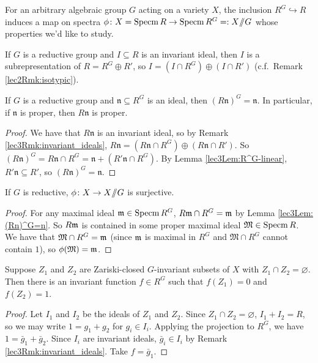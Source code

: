 
For an arbitrary algebraic group $G$ acting on a variety $X$, the inclusion $R^G\hookrightarrow R$ induces a map on spectra $\phi\colon X=\operatorname{Specm} R\to \operatorname{Specm} R^G=:X\mbox{\rm /\!\!/} G$ whose properties we'd like to study.
\begin{remark}\label{lec3Rmk:invariant_ideals}
 If $G$ is a reductive group and $I\subseteq R$ is an invariant ideal, then $I$ is a subrepresentation of $R=R^G\oplus R'$, so $I=(I\cap R^G)\oplus (I\cap R')$ (c.f.~Remark \ref{lec2Rmk:isotypic}).
\end{remark}
\begin{lemma}\label{lec3Lem:(Rn)^G=n}
 If $G$ is a reductive group and $\mathfrak n\subseteq R^G$ is an ideal, then $(R \mathfrak n)^G=\mathfrak n$. In particular, if $\mathfrak n$ is proper, then $R \mathfrak n$ is proper.
\end{lemma}
\begin{proof}
 We have that $R \mathfrak n$ is an invariant ideal, so by Remark \ref{lec3Rmk:invariant_ideals}, $R\mathfrak n=(R\mathfrak n\cap R^G)\oplus (R\mathfrak n\cap R')$. So $(R\mathfrak n)^G= R\mathfrak n\cap R^G = \mathfrak n + (R'\mathfrak n\cap R^G)$. By Lemma \ref{lec3Lem:R^G-linear}, $R'\mathfrak n\subseteq R'$, so $(R\mathfrak n)^G=\mathfrak n$.
\end{proof}
\begin{corollary}\label{lec3Cor:phi_surjective}
 If $G$ is reductive, $\phi\colon X\to X\mbox{\rm /\!\!/} G$ is surjective.
\end{corollary}
\begin{proof}
 For any maximal ideal $\mathfrak{m}\in \operatorname{Specm} R^G$, $R\mathfrak{m}\cap R^G=\mathfrak{m}$ by Lemma \ref{lec3Lem:(Rn)^G=n}. So $R\mathfrak{m}$ is contained in some proper maximal ideal $\mathfrak M\in \operatorname{Specm} R$. We have that $\mathfrak M \cap R^G=\mathfrak{m}$ (since $\mathfrak{m}$ is maximal in $R^G$ and $\mathfrak M\cap R^G$ cannot contain $1$), so $\phi(\mathfrak M)=\mathfrak{m}$.
\end{proof}
\begin{lemma}\label{lec3Lem:separation}
 Suppose $Z_1$ and $Z_2$ are Zariski-closed $G$-invariant subsets of $X$ with $Z_1\cap Z_2=\varnothing$. Then there is an invariant function $f\in R^G$ such that $f(Z_1)=0$ and $f(Z_2)=1$.
\end{lemma}
\begin{proof}
 Let $I_1$ and $I_2$ be the ideals of $Z_1$ and $Z_2$. Since $Z_1\cap Z_2=\varnothing$, $I_1+I_2=R$, so we may write $1=g_1+g_2$ for $g_i\in I_i$. Applying the projection to $R^G$, we have $1=\bar g_1+\bar g_2$. Since $I_i$ are invariant ideals, $\bar g_i\in I_i$ by Remark \ref{lec3Rmk:invariant_ideals}. Take $f=\bar g_1$.
\end{proof}
